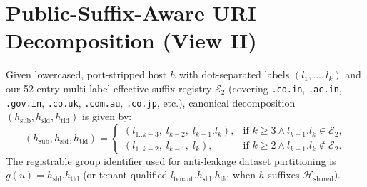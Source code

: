 \documentclass[12pt,a4paper]{report}
\begin{document}
\section{Public-Suffix-Aware URI Decomposition (View II)}
Given lowercased, port-stripped host $h$ with dot-separated labels $(l_1, \dots, l_k)$ and our 52-entry multi-label effective suffix registry $\mathcal{E}_2$ (covering \texttt{.co.in}, \texttt{.ac.in}, \texttt{.gov.in}, \texttt{.co.uk}, \texttt{.com.au}, \texttt{.co.jp}, etc.), canonical decomposition $(h_{\text{sub}}, h_{\text{sld}}, h_{\text{tld}})$ is given by:
\begin{equation}
(h_{\text{sub}}, h_{\text{sld}}, h_{\text{tld}}) =
\begin{cases}
(l_{1..k-3},\; l_{k-2},\; l_{k-1}.l_k), & \text{if } k \ge 3 \land l_{k-1}.l_k \in \mathcal{E}_{2}, \\
(l_{1..k-2},\; l_{k-1},\; l_k), & \text{if } k \ge 2 \land l_{k-1}.l_k \notin \mathcal{E}_{2}.
\end{cases}
\label{eq:rep_etld}
\end{equation}
The registrable group identifier used for anti-leakage dataset partitioning is $g(u) = h_{\text{sld}}.h_{\text{tld}}$ (or tenant-qualified $l_{\text{tenant}}.h_{\text{sld}}.h_{\text{tld}}$ when $h$ suffixes $\mathcal{H}_{\text{shared}}$).
\end{document}
